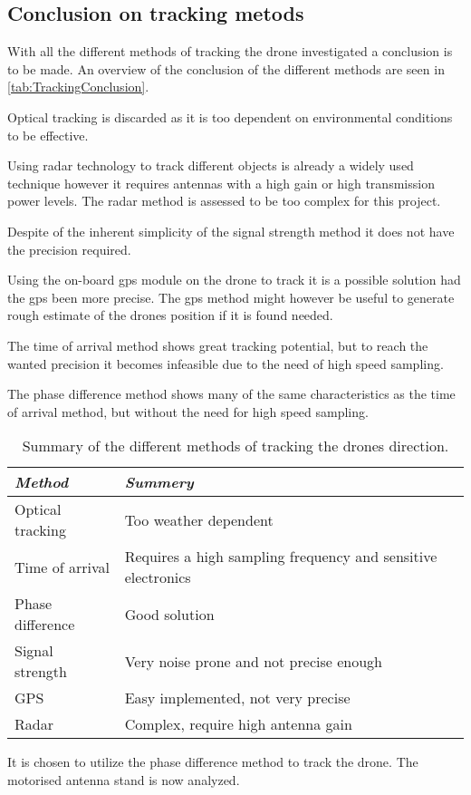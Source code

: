 \subsection{Conclusion on tracking metods}\label{sec:pre:trackingConclusion}
With all the different methods of tracking the drone investigated a conclusion is to be made. An overview of the conclusion of the different methods are seen in \autoref{tab:TrackingConclusion}.

Optical tracking is discarded as it is too dependent on environmental conditions to be effective.

Using radar technology to track different objects is already a widely used technique however it requires antennas with a high gain or high transmission power levels. The radar method is assessed to be too complex for this project.  

Despite of the inherent simplicity of the signal strength method it does not have the precision required.

Using the on-board \gls{gps} module on the drone to track it is a possible solution had the \gls{gps} been more precise. The \gls{gps} method might however be useful to generate rough estimate of the drones position if it is found needed. 

The time of arrival method shows great tracking potential, but to reach the wanted precision it becomes infeasible due to the need of high speed sampling.

The phase difference method shows many of the same characteristics as the time of arrival method, but without the need for high speed sampling.

\begin{table}[h!]
\centering
\caption{Summary of the different methods of tracking the drones direction.}
\begin{tabularx}{\textwidth}{l X }
	\textit{Method} 	& \textit{Summery} 	\\ \toprule \rowcolor{lightGrey}
	Optical tracking	& Too weather dependent 					\\
	Time of arrival		& Requires a high sampling frequency and sensitive electronics \\ \rowcolor{lightGrey}
	Phase difference 	& Good solution	\\ 
	Signal strength 	& Very noise prone and not precise enough \\\rowcolor{lightGrey}
	GPS					& Easy implemented, not very precise \\ 
	Radar & Complex, require high antenna gain\\
\end{tabularx}
\end{table} \label{tab:TrackingConclusion}

It is chosen to utilize the phase difference method to track the drone. The motorised antenna stand is now analyzed.

